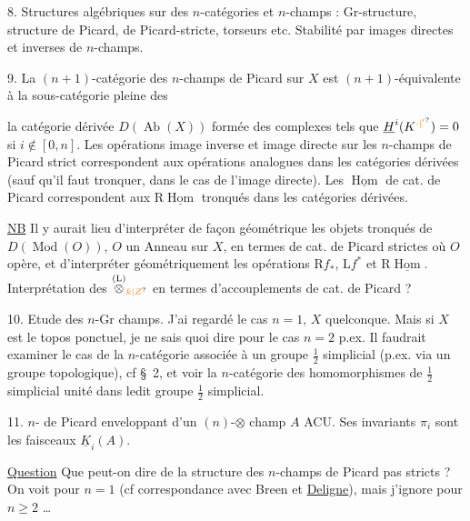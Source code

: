8. Structures algébriques sur des $n$-catégories et
$n$-champs : Gr-structure, structure de Picard,
de Picard-stricte, torseurs etc. Stabilité par images
directes et inverses de $n$-champs.

9. La $(n+1)$-catégorie des $n$-champs de Picard  sur $X$
est $(n+1)$-équivalente à la sous-catégorie pleine des

la catégorie dérivée $D(\operatorname{Ab}(X))$ formée des complexes
  tels que $\underline H^i(K^{\unsure{\cdot|'}})=0$ si $i\notin[0,n]$. Les
opérations image inverse et image directe  sur les
$n$-champs de Picard strict correspondent aux
opérations analogues dans les catégories dérivées (sauf
qu'il faut tronquer, dans le cas de l'image
directe). Les $\underline{\operatorname{Hom}}$ de cat. de Picard 
correspondent aux $\mathrm R\underline{\operatorname{Hom}}$ tronqués  dans les
catégories dérivées.

\uline{NB} Il y aurait lieu d'interpréter de façon
géométrique les objets tronqués de $D(\operatorname{Mod}(O))$,
$O$ un Anneau sur $X$, en termes de cat. de
Picard strictes où $O$ opère, et d'interpréter géométriquement les opérations $\mathrm Rf_*$,  $\mathrm Lf^*$ et $\mathrm R\underline{\operatorname{Hom}}$.
Interprétation des $\overset{(\mathrm L)}{\otimes}_{\unsure{k|Z}}$ en termes d'accouplements
 de cat. de Picard ?

10. Etude des $n$-Gr champs.  J'ai regardé le
cas $n=1$, $X$ quelconque. Mais  si $X$ est le
topos ponctuel, je ne sais quoi dire pour le
cas $n=2$ p.ex. Il faudrait examiner le cas
de la $n$-catégorie associée à un groupe $\frac12$ simplicial (p.ex. via un groupe topologique), cf \S~2, et voir
la $n$-catégorie des homomorphismes de  
$\frac12$ simplicial unité dans ledit groupe $\frac12$ simplicial.

11. $n$- de Picard  enveloppant d'un $(n)$-$\otimes$ champ $A$
ACU. Ses invariants $\pi_i$ sont les faisceaux $\underline{K}_i(A)$.

\uline{Question} Que peut-on dire de la structure des $n$-champs de Picard pas stricts ? On voit pour $n=1$
(cf correspondance avec Breen et \uline{Deligne}), mais
j'ignore pour $n\geq2$ \ldots
